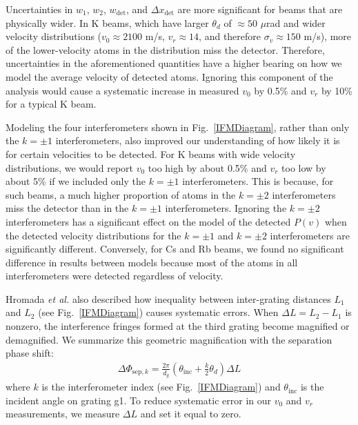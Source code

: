 \documentclass[twocolumn,pra,showpacs,superscriptaddress,longbibliography]{revtex4-1}   %
\newcommand{\figref}[1]{Fig.~\ref{#1}}
\newcommand{\dphisepk}{\Delta\Phi_{\mathrm{sep},k}}
\newcommand{\etalspace}{\textit{et al. }}
\begin{document}
Uncertainties in $w_1$, $w_2$, $w_{\mathrm{det}}$, and $\Delta x_{\mathrm{det}}$ are more significant for beams that are physically wider. 
In K beams, which have larger $\theta_d$ of $\approx 50$ $\mu$rad and wider velocity distributions 
($v_0 \approx 2100$ m/s, $v_r \approx 14$, and therefore $\sigma_v \approx 150$ m/s), more of the lower-velocity atoms in the distribution miss the detector. Therefore, uncertainties in the aforementioned quantities have a higher bearing on how we model the average velocity of detected atoms.
Ignoring this component of the analysis would cause a systematic increase in measured $v_0$ by 0.5\% and $v_r$ by 10\% for a typical K beam.

Modeling the four interferometers shown in \figref{IFMDiagram}, rather than only the $k=\pm1$ interferometers, also improved our understanding of how likely it is for certain velocities to be detected. For K beams with wide velocity distributions, 
we would report $v_0$ too high by about 0.5\% and $v_r$ too low by about 5\% if we included only the $k=\pm 1$ interferometers.
This is because, for such beams, a much higher proportion of atoms in the $k=\pm2$ interferometers miss the detector than in the $k=\pm1$ interferometers. 
Ignoring the $k=\pm 2$ interferometers has a significant effect on the model of the detected $P(v)$ when the detected velocity distributions for the $k=\pm1$ and $k=\pm2$ interferometers are significantly different.
Conversely, for Cs and Rb beams, we found no significant difference in results between models because most of the atoms in all interferometers were detected regardless of velocity.

Hromada \etalspace \cite{Hromada2014} also described how inequality between inter-grating distances $L_1$ and $L_2$ (see \figref{IFMDiagram}) causes systematic errors. 
When $\Delta L = L_2 - L_1$ is nonzero, the interference fringes formed at the third grating become magnified or demagnified.
We summarize this geometric magnification with the separation phase shift:
\begin{align}
	\dphisepk = \frac{2\pi}{d_g}
	\left(
		\theta_{\mathrm{inc}} + \frac{k}{2}\theta_d
	\right) \Delta L
	\label{phiSep}
\end{align}
where $k$ is the interferometer index (see \figref{IFMDiagram}) and $\theta_{\mathrm{inc}}$ is the incident angle on grating g1. 
To reduce systematic error in our $v_0$ and $v_r$ measurements, 
we measure $\Delta L$ and set it equal to zero.
\end{document}
